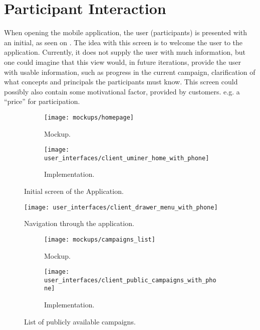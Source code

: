 
\section{Participant Interaction}

When opening the mobile application, the user (participants) is presented with an initial, as seen on . The idea with this screen is to welcome the user to the application. Currently, it does not supply the user with much information, but one could imagine that this view would, in future iterations, provide the user with usable information, such as progress in the current campaign, clarification of what concepts and principals the participants must know. This screen could possibly also contain some motivational factor, provided by customers. e.g. a ``price'' for participation. 

\begin{figure}
\begin{subfigure}[!t]{.48\textwidth}
  \centering
  \texttt{[image: mockups/homepage]}
  \caption{Mockup.}
  \label{fig:mockup_initial_screen}
\end{subfigure}%
\begin{subfigure}[!t]{.52\textwidth}
  \centering
  \texttt{[image: user\_interfaces/client\_uminer\_home\_with\_phone]}
  \caption{Implementation.}
  \label{fig:implementation_initial_screen}
\end{subfigure}
\caption{Initial screen of the Application.}
\label{fig:initial_screen}
\end{figure}
\FloatBarrier

\begin{figure}
\centering
\texttt{[image: user\_interfaces/client\_drawer\_menu\_with\_phone]}
\caption{Navigation through the application.}
\label{fig:navigation}
\end{figure}
\FloatBarrier

\begin{figure}
\begin{subfigure}[!t]{.48\textwidth}
  \centering
  \texttt{[image: mockups/campaigns\_list]}
  \caption{Mockup.}
  \label{fig:mockup_public_campaigns}
\end{subfigure}%
\begin{subfigure}[!t]{.52\textwidth}
  \centering
  \texttt{[image: user\_interfaces/client\_public\_campaigns\_with\_phone]}
  \caption{Implementation.}
  \label{fig:implementation_public_campaigns}
\end{subfigure}
\caption{List of publicly available campaigns.}
\label{fig:public_campaigns}
\end{figure}
\FloatBarrier

